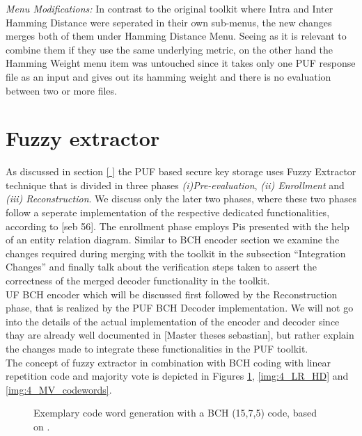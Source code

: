 \emph{Menu Modifications:} In contrast to the original toolkit where Intra and Inter Hamming Distance were seperated in their own sub-menus, the new changes merges both of them under Hamming Distance Menu. Seeing as it is relevant to combine them if they use the same underlying metric, on the other hand the Hamming Weight menu item was untouched since it takes only one PUF response file as an input and gives out its hamming weight and there is no evaluation between two or
more files.\\


\section{Fuzzy extractor}
As discussed in section \ref{ } the PUF based secure key storage uses Fuzzy Extractor technique that is divided in three phases \emph{(i)Pre-evaluation}, \emph{(ii) Enrollment} and \emph{(iii) Reconstruction}. We discuss only the later two phases, where these two phases follow a seperate implementation of the respective dedicated functionalities, according to [seb 56]. The enrollment phase employs Pis presented with the help of an entity relation diagram. Similar to BCH encoder
section we examine the changes required during merging with the toolkit in the subsection ``Integration Changes'' and finally talk about the verification steps taken to assert the correctness of the merged decoder functionality in the toolkit.\\UF BCH encoder which will be discussed first followed by the Reconstruction phase, that is
realized by the PUF BCH Decoder implementation. We will not go into the details of the actual implementation of the encoder and decoder since thay are already well documented in [Master theses sebastian], but rather explain the changes made to integrate these functionalities in the PUF toolkit.\\

The concept of fuzzy extractor in combination with BCH coding with linear repetition code and majority vote is depicted in Figures \ref{img:4_BCH_concept}, \ref{img:4_LR_HD} and \ref{img:4_MV_codewords}.\pagebreak

\begin{figure}[h]
\centering
{}
\caption{Exemplary code word generation with a BCH (15,7,5) code, based on \cite{10}.}
\label{img:4_BCH_concept}
\end{figure}

